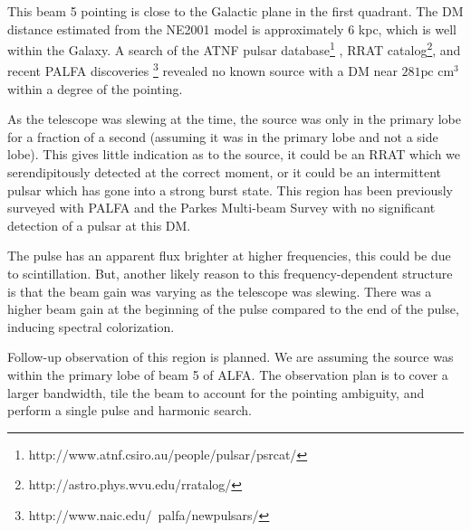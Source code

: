 \documentclass[a4paper,fleqn,usenatbib]{mnras}
\begin{document}
This beam 5 pointing is close to the Galactic plane in the first quadrant. The
DM distance estimated from the NE2001 model \citep{2002astro.ph..7156C} is
approximately 6 kpc, which is well within the Galaxy. A search of the ATNF
pulsar database\footnote{http://www.atnf.csiro.au/people/pulsar/psrcat/}
\citep{2005AJ....129.1993M}, RRAT
catalog\footnote{http://astro.phys.wvu.edu/rratalog/}, and recent PALFA
discoveries \footnote{http://www.naic.edu/~palfa/newpulsars/} revealed no known
source with a DM near $281 \textrm{pc cm}^3$ within a degree of the pointing.

As the telescope was slewing at the time, the source was only in the primary
lobe for a fraction of a second (assuming it was in the primary lobe and not a
side lobe). This gives little indication as to the source, it could be an RRAT
which we serendipitously detected at the correct moment, or it could be an
intermittent pulsar which has gone into a strong burst state. This region has
been previously surveyed with PALFA and the Parkes Multi-beam Survey
\citep{2001MNRAS.328...17M} with no significant detection of a pulsar at this
DM.

The pulse has an apparent flux brighter at higher frequencies, this could be due
to scintillation. But, another likely reason to this frequency-dependent
structure is that the beam gain was varying as the telescope was slewing. There
was a higher beam gain at the beginning of the pulse compared to the end of the
pulse, inducing spectral colorization.

Follow-up observation of this region is planned. We are assuming the source was
within the primary lobe of beam 5 of ALFA. The observation plan is to cover a
larger bandwidth, tile the beam to account for the pointing ambiguity, and
perform a single pulse and harmonic search.





\end{document}
